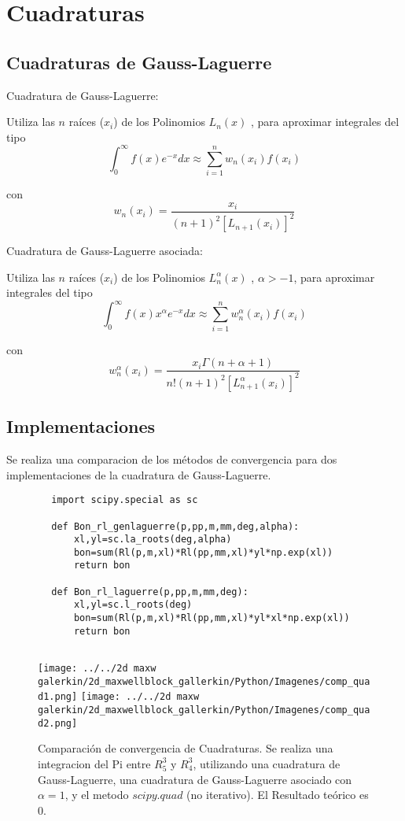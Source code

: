 \section{Cuadraturas}
	\subsection{Cuadraturas de Gauss-Laguerre}
	
	Cuadratura de Gauss-Laguerre:
	
	Utiliza las $n$ raíces ($x_i$) de los Polinomios $L_n(x)$ , para aproximar integrales del tipo
	\[ \int_{0}^{\infty}f(x)e^{-x}dx\approx \sum_{i=1}^n w_n(x_i) f(x_i)   \]
	
	con 
	\[w_n(x_i)=\frac{x_i}{(n+1)^2[L_{n+1}(x_i)]^2}\]
	
	Cuadratura de Gauss-Laguerre asociada:
	
	Utiliza las $n$ raíces ($x_i$) de los Polinomios $L_n^{\alpha}(x)$ , $\alpha > -1$, para aproximar integrales del tipo
	\[ \int_{0}^{\infty}f(x)x^{\alpha}e^{-x}dx\approx \sum_{i=1}^n w^{\alpha}_n(x_i) f(x_i)    \]
	
	con 
	\[w^{\alpha}_n(x_i)=\frac{x_i \Gamma(n+\alpha +1)}{n!(n+1)^2[L^{\alpha}_{n+1}(x_i)]^2}\]
	
	
	\subsection{Implementaciones}
		
		Se realiza una comparacion de los métodos de convergencia para dos implementaciones de la cuadratura de Gauss-Laguerre.
		\begin{lstlisting}
		import scipy.special as sc
		
		def Bon_rl_genlaguerre(p,pp,m,mm,deg,alpha):
			xl,yl=sc.la_roots(deg,alpha)
			bon=sum(Rl(p,m,xl)*Rl(pp,mm,xl)*yl*np.exp(xl))
			return bon
			
		def Bon_rl_laguerre(p,pp,m,mm,deg):
			xl,yl=sc.l_roots(deg)
			bon=sum(Rl(p,m,xl)*Rl(pp,mm,xl)*yl*xl*np.exp(xl))
			return bon    
			
		\end{lstlisting}
		
		
		\begin{figure}[h]
			\texttt{[image: ../../2d maxw galerkin/2d\_maxwellblock\_gallerkin/Python/Imagenes/comp\_quad1.png]}
			\texttt{[image: ../../2d maxw galerkin/2d\_maxwellblock\_gallerkin/Python/Imagenes/comp\_quad2.png]}
			\caption{Comparación de convergencia de  Cuadraturas. Se realiza una integracion del Pi entre $R_5^3$ y $R_4^3$, utilizando una cuadratura de Gauss-Laguerre, una cuadratura de Gauss-Laguerre asociado con $\alpha =1$, y el metodo $scipy.quad$ (no iterativo). El Resultado teórico es $0$. }
		\end{figure}
		
